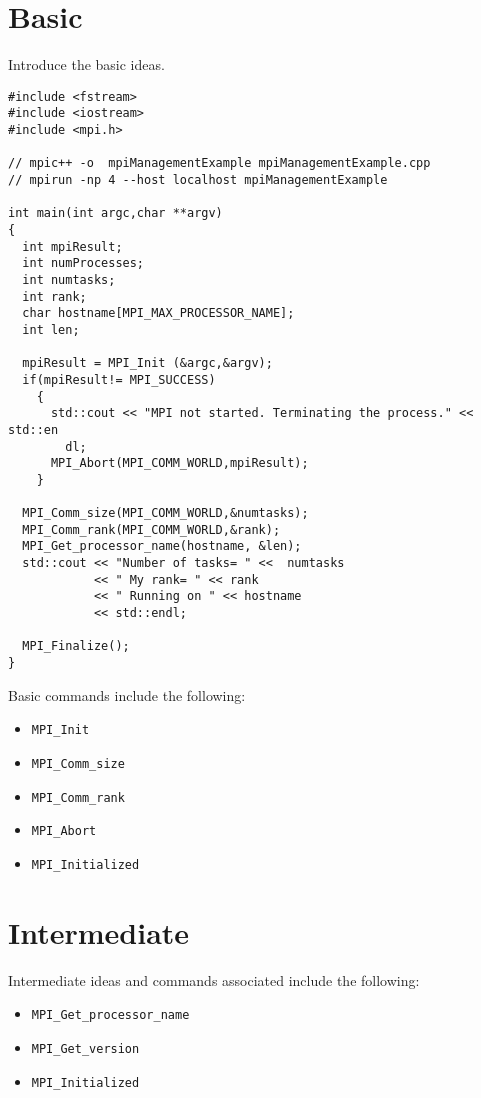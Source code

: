 
\section{Basic}

Introduce the basic ideas.

\lstset{language=C++, numbers=left, numberstyle=\tiny, stepnumber=1,
  numbersep=5pt, commentstyle=\scriptsize}
\begin{lstlisting}[caption={Basic Process Information},
                   basicstyle=\scriptsize,
                   label=listing:touch]
#include <fstream>
#include <iostream>
#include <mpi.h>

// mpic++ -o  mpiManagementExample mpiManagementExample.cpp 
// mpirun -np 4 --host localhost mpiManagementExample

int main(int argc,char **argv)
{
  int mpiResult;
  int numProcesses;
  int numtasks;
  int rank;
  char hostname[MPI_MAX_PROCESSOR_NAME];
  int len;

  mpiResult = MPI_Init (&argc,&argv);
  if(mpiResult!= MPI_SUCCESS)
    {
      std::cout << "MPI not started. Terminating the process." << std::en
        dl;
      MPI_Abort(MPI_COMM_WORLD,mpiResult);
    }

  MPI_Comm_size(MPI_COMM_WORLD,&numtasks);
  MPI_Comm_rank(MPI_COMM_WORLD,&rank);
  MPI_Get_processor_name(hostname, &len);
  std::cout << "Number of tasks= " <<  numtasks
            << " My rank= " << rank
            << " Running on " << hostname
            << std::endl;

  MPI_Finalize();
}
\end{lstlisting}

Basic commands include the following: \\
\begin{itemize}
\item \texttt{MPI\_Init}
\item \texttt{MPI\_Comm\_size}
\item \texttt{MPI\_Comm\_rank}
\item \texttt{MPI\_Abort}
\item \texttt{MPI\_Initialized}
\end{itemize}


\section{Intermediate}

Intermediate ideas and commands associated include the following: \\
\begin{itemize}
\item \texttt{MPI\_Get\_processor\_name}
\item \texttt{MPI\_Get\_version}
\item \texttt{MPI\_Initialized}
\end{itemize}

